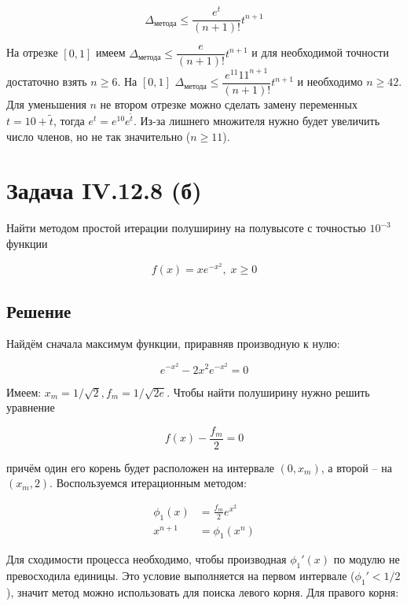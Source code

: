 \documentclass[a4paper,12pt]{article}
\begin{document}
\begin{equation}
    \Delta_\text{метода} \leq \frac{e^t}{(n + 1)!} t^{n + 1}
\end{equation}

На отрезке $[0, 1]$ имеем $\Delta_\text{метода} \leq \dfrac{e}{(n + 1)!} t^{n + 1}$ и для необходимой точности достаточно взять $n \geq 6$. На $[0, 1]$  $\Delta_\text{метода} \leq \dfrac{e^{11} 11^{n + 1}}{(n + 1)!} t^{n + 1}$ и необходимо $n \geq 42$. Для уменьшения $n$ не втором отрезке можно сделать замену переменных $t = 10 + \tilde{t}$, тогда $e^t = e^{10} e^{\tilde{t}}$. Из-за лишнего множителя нужно будет увеличить число членов, но не так значительно ($n \geq 11$).

\section*{Задача IV.12.8 (б)}

Найти методом простой итерации полуширину на полувысоте с точностью $10^{-3}$ функции

\begin{equation*}
    f(x) = x e^{-x^2}, \; x \geq 0
\end{equation*}

\subsection*{Решение}

Найдём сначала максимум функции, приравняв производную к нулю:

\begin{equation*}
    e^{-x^2} - 2 x^2 e^{-x^2} = 0
\end{equation*}

Имеем: $x_m = 1 / \sqrt{2}, f_m = 1 / \sqrt{2 e}$. Чтобы найти полуширину нужно решить уравнение

\begin{equation*}
    f(x) - \frac{f_m}{2} = 0
\end{equation*}

\noindent
причём один его корень будет расположен на интервале $(0, x_m)$, а второй -- на $(x_m, 2)$. Воспользуемся итерационным методом:

\begin{align*}
    \phi_1 (x) &= \frac{f_m}{2} e^{x^2} \\
    x^{n + 1} &= \phi_1 (x^n)
\end{align*}

Для сходимости процесса необходимо, чтобы производная $\phi_1' (x)$ по модулю не превосходила единицы. Это условие выполняется на первом интервале ($\phi_1' < 1 / 2$), значит метод можно использовать для поиска левого корня. Для правого корня:
\end{document}
